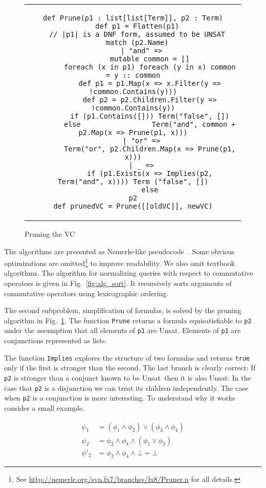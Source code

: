 \documentclass{llncs}
\def\lstinlinen{\lstinline[basicstyle=\normalsize\sffamily]}
\def\unsat{{\sc Unsat}}
\def\false{\bot}
\begin{document}
\begin{figure}[t]
  \centering
\begin{tabular}{c}
\begin{lstlisting}
def Prune(p1 : list[list[Term]], p2 : Term)
  def p1 = Flatten(p1)
  // |p1| is a DNF form, assumed to be UNSAT
  match (p2.Name)
    | "and" =>
        mutable common = []
        foreach (x in p1) foreach (y in x) common = y :: common
        def p1 = p1.Map(x => x.Filter(y => !common.Contains(y)))
        def p2 = p2.Children.Filter(y => !common.Contains(y))
        if (p1.Contains([])) Term("false", [])
        else                 Term("and", common + p2.Map(x => Prune(p1, x)))
    | "or" =>
        Term("or", p2.Children.Map(x => Prune(p1, x)))
    | _ =>
        if (p1.Exists(x => Implies(p2, Term("and", x)))) Term ("false", [])
        else                                             p2
def prunedVC = Prune([[oldVC]], newVC)
\end{lstlisting}
\end{tabular}
  \caption{Pruning the VC}
  \label{fig:alg_prune}
\end{figure}

The algorithms are presented as Nemerle-like pseudocode~\cite{nemerle}.
Some obvious optimizations are omitted\footnote{See
\url{http://nemerle.org/svn.fx7/branches/fx8/Pruner.n} for all details.} 
to improve readability. We also omit textbook algorithms.
The algorithm for normalizing queries with respect to 
commutative operators is given in Fig.~\ref{fig:alg_sort}.
It recursively sorts arguments of commutative operators
using lexicographic ordering.

The second subproblem, simplification of formulas, is
solved by the pruning algorithm in Fig.~\ref{fig:alg_prune}. 
The function \lstinlinen|Prune| returns a formula equisatisfiable
to \lstinlinen|p2| under the assumption that all elements
of \lstinlinen|p1| are \unsat. Elements of \lstinlinen|p1|
are conjunctions represented as lists.

The function \lstinlinen|Implies| explores the structure of two
formulas and returns \lstinlinen|true| only if the first is
stronger than the second. The last branch is clearly correct: 
If \lstinlinen|p2| is stronger than a conjunct known to be 
\unsat\ then it is also \unsat. In the case that 
\lstinlinen|p2| is a disjunction we can treat  its children 
independently. The case when \lstinlinen|p2| is
a conjunction is more interesting. To understand why it works
consider a small example.

\begin{align}
\psi_1 &= (\phi_1\land\phi_2) \lor (\phi_3\land\phi_4) \\
\psi_2 &= \phi_2 \land \phi_4 \land (\phi_1\lor\phi_3) \\
\psi'_2&= \phi_2 \land \phi_4 \land \false = \false
\end{align}
\end{document}
